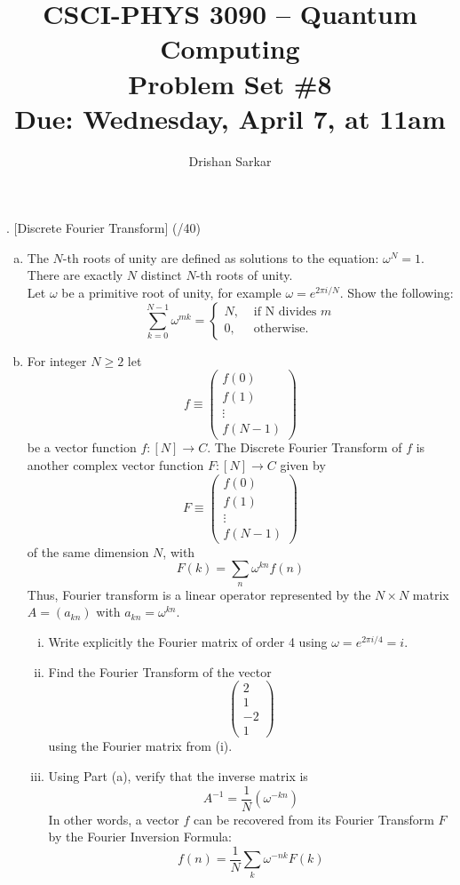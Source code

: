 \documentclass[11pt]{article}
\begin{document}
\date{}
\author{Drishan Sarkar}
\title{CSCI-PHYS 3090 -- Quantum Computing \\ Problem Set \#8 \\ Due: Wednesday, April 7, at 11am}
\maketitle

. [Discrete Fourier Transform] (/40)

\begin{enumerate}[(a)]
    \item The $N$-th roots of unity are defined as solutions to the equation: $\omega^N=1$. There are exactly $N$ distinct $N$-th roots of unity. \\ Let $\omega$ be a primitive root of unity, for example $\omega=e^{2\pi i/N}$. Show the following: 
    \[
	\sum_{k=0}^{N-1}\omega^{mk} = 
	\begin{cases} 
	N, & \text{ if N divides } m\\
	0, & \text{ otherwise. } 
	\end{cases} 
	\]
    \item For integer $N\geq 2$ let
    $$f \equiv \begin{pmatrix}f(0)\\f(1)\\\vdots\\f(N-1)\end{pmatrix} $$
    be a vector function $f : [N]\rightarrow C$. The Discrete Fourier Transform of $f$ is another complex vector function $F : [N]\rightarrow C$ given by 
    $$F \equiv \begin{pmatrix}f(0)\\f(1)\\\vdots\\f(N-1)\end{pmatrix} $$
    of the same dimension $N$, with 
    $$F(k)=\sum_n\omega^{kn}f(n)$$
    Thus, Fourier transform is a linear operator represented by the $N\times N$ matrix $A=(a_{kn})$ with $a_{kn}=\omega^{kn}$.
    \begin{enumerate}[(i)]
        \item Write explicitly the Fourier matrix of order 4 using $\omega=e^{2\pi i/4}=i$.
        \item Find the Fourier Transform of the vector $$\begin{pmatrix}2\\1\\-2\\1\end{pmatrix}$$ using the Fourier matrix from (i).
        \item Using Part (a), verify that the inverse matrix is $$A^{-1}=\frac{1}{N}(\omega^{-kn})$$
        In other words, a vector $f$ can be recovered from its Fourier Transform $F$ by the Fourier Inversion Formula: $$f(n)=\frac{1}{N}\sum_k\omega^{-nk}F(k)$$
    \end{enumerate}
\end{enumerate}
\end{document}
